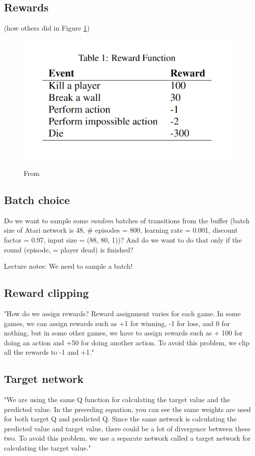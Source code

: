 \documentclass[a4paper ,12pt]{report}
\begin{document}
	\subsection*{Rewards}
	
	(how others did in Figure \ref{fig:rewards})
	
	\begin{figure}[ht]
		\caption{From \cite{GoulartBomberman}}
		\includegraphics{rewards.png}
		\label{fig:rewards}
	\end{figure}
		
	\subsection*{Batch choice}
	Do we want to sample some \textit{random} batches of transitions from the buffer (batch size of Atari network is 48, \# episodes = 800, learning rate = 0.001, discount factor = 0.97, input size = (88, 80, 1))? And do we want to do that only if the round (episode, = player dead) is finished?
	
	Lecture notes: We need to sample a batch!
	
	\subsection*{Reward clipping}
	"How do we assign rewards? Reward assignment varies for each game. In some games, we can assign rewards such as +1 for winning, -1 for loss, and 0 for nothing, but in some other games, we have to assign rewards such as + 100 for doing an action and +50 for doing another action. To avoid this problem, we clip all the rewards to -1 and +1." \cite{UBHD-68505368}
	
	\subsection*{Target network}
	"We are using the same Q function for calculating the target value and the predicted value. In the preceding equation, you can see the same weights  are used for both target Q and predicted Q. Since the same network is calculating the predicted value and target value, there could be a lot of divergence between these two. To avoid this problem, we use a separate network called a target network for calculating the target value." \cite{UBHD-68505368}
	
	
	
\end{document}
